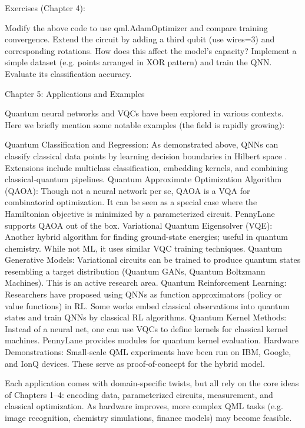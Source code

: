 Exercises (Chapter 4):



Modify the above code to use qml.AdamOptimizer and compare training convergence.
Extend the circuit by adding a third qubit (use wires=3) and corresponding rotations. How does this affect the model’s capacity?
Implement a simple dataset (e.g. points arranged in XOR pattern) and train the QNN. Evaluate its classification accuracy.






Chapter 5: Applications and Examples





Quantum neural networks and VQCs have been explored in various contexts.  Here we briefly mention some notable examples (the field is rapidly growing):



Quantum Classification and Regression: As demonstrated above, QNNs can classify classical data points by learning decision boundaries in Hilbert space .  Extensions include multiclass classification, embedding kernels, and combining classical-quantum pipelines.
Quantum Approximate Optimization Algorithm (QAOA): Though not a neural network per se, QAOA is a VQA for combinatorial optimization. It can be seen as a special case where the Hamiltonian objective is minimized by a parameterized circuit. PennyLane supports QAOA out of the box.
Variational Quantum Eigensolver (VQE): Another hybrid algorithm for finding ground-state energies; useful in quantum chemistry. While not ML, it uses similar VQC training techniques.
Quantum Generative Models: Variational circuits can be trained to produce quantum states resembling a target distribution (Quantum GANs, Quantum Boltzmann Machines). This is an active research area.
Quantum Reinforcement Learning: Researchers have proposed using QNNs as function approximators (policy or value functions) in RL. Some works embed classical observations into quantum states and train QNNs by classical RL algorithms.
Quantum Kernel Methods: Instead of a neural net, one can use VQCs to define kernels for classical kernel machines. PennyLane provides modules for quantum kernel evaluation.
Hardware Demonstrations: Small-scale QML experiments have been run on IBM, Google, and IonQ devices. These serve as proof-of-concept for the hybrid model.




Each application comes with domain-specific twists, but all rely on the core ideas of Chapters 1–4: encoding data, parameterized circuits, measurement, and classical optimization.  As hardware improves, more complex QML tasks (e.g. image recognition, chemistry simulations, finance models) may become feasible.



